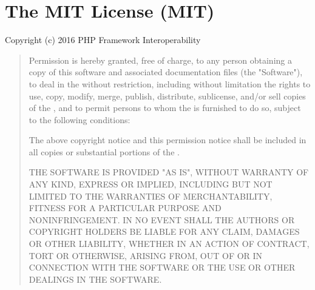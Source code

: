 \chapter{The MIT License (MIT)}
\hypertarget{md_public_2glpi_2vendor_2psr_2simple-cache_2_l_i_c_e_n_s_e}{}\label{md_public_2glpi_2vendor_2psr_2simple-cache_2_l_i_c_e_n_s_e}
\label{md_public_2glpi_2vendor_2psr_2simple-cache_2_l_i_c_e_n_s_e_autotoc_md6958}%
%
 Copyright (c) 2016 PHP Framework Interoperability 

\begin{quote}
Permission is hereby granted, free of charge, to any person obtaining a copy of this software and associated documentation files (the "{}\+Software"{}), to deal in the  without restriction, including without limitation the rights to use, copy, modify, merge, publish, distribute, sublicense, and/or sell copies of the , and to permit persons to whom the  is furnished to do so, subject to the following conditions\+:

The above copyright notice and this permission notice shall be included in all copies or substantial portions of the .

THE SOFTWARE IS PROVIDED "{}\+AS IS"{}, WITHOUT WARRANTY OF ANY KIND, EXPRESS OR IMPLIED, INCLUDING BUT NOT LIMITED TO THE WARRANTIES OF MERCHANTABILITY, FITNESS FOR A PARTICULAR PURPOSE AND NONINFRINGEMENT. IN NO EVENT SHALL THE AUTHORS OR COPYRIGHT HOLDERS BE LIABLE FOR ANY CLAIM, DAMAGES OR OTHER LIABILITY, WHETHER IN AN ACTION OF CONTRACT, TORT OR OTHERWISE, ARISING FROM, OUT OF OR IN CONNECTION WITH THE SOFTWARE OR THE USE OR OTHER DEALINGS IN THE SOFTWARE. \end{quote}
